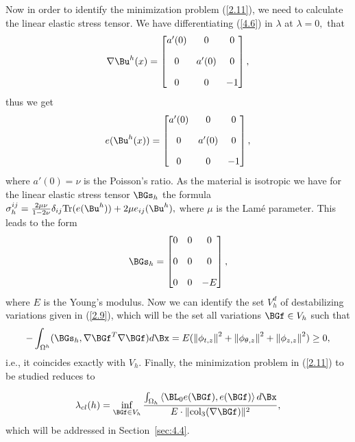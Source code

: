 Now in order to identify the minimization problem (\ref{2.11}), we need to calculate the linear elastic stress tensor. We have differentiating (\ref{4.6}) in $\lambda$ at $\lambda=0,$ that 
$$
\nabla \Bu^h(x)=
\begin{bmatrix} 
a'(0) & 0 & 0\\[10pt]
0 & a'(0) & 0\\[10pt] 
0&0&-1
\end{bmatrix},
$$
thus we get 
$$e(\Bu^h(x))=
\begin{bmatrix} 
a'(0) &  0 & 0\\[10pt]
 0 & a'(0)& 0\\[10pt] 
 0 &0 &-1
 \end{bmatrix},
 $$
 where $a'(0)=\nu$ is the Poisson's ratio. As the material is isotropic we have for the 
 linear elastic stress tensor $\BGs_h$ the formula $\Gs_h^{ij}=\frac{2\mu\nu}{1-2\nu}\delta_{ij} \mathrm{Tr}(e(\Bu^h))+2\mu e_{ij}(\Bu^h),$ where $\mu$ is the Lam\'e parameter. This leads to the form 
\begin{equation}
\label{4.9} 
\BGs_h=
 \begin{bmatrix} 
0 & 0& 0\\[10pt]
 0 & 0 & 0\\[10pt]
 0 & 0 & -E
 \end{bmatrix},
 \end{equation}
where $E$ is the Young's modulus. Now we can identify the set $V_h^d$ of destabilizing variations given in (\ref{2.9}), which will be the set all variations $\BGf\in V_h$ such that 
$$-\int_{\Omega^h}(\BGs_h,\nabla\BGf^T\nabla\BGf)d\Bx=E(\left\|\phi_{t,z}\right\|^{2}+\left\|\phi_{\theta,z}\right\|^{2}+\left\|\phi_{z,z}\right\|^{2})\geq 0,$$
i.e., it coincides exactly with $V_h.$ Finally, the minimization problem in (\ref{2.11}) to be studied reduces to 

\begin{equation}
\label{4.10}
\Gl_{cl}(h)=\inf_{\BGf\in V_h} \frac{\int_{\Omega_h} \left\langle \BL_{0} e(\BGf), e(\BGf)\right\rangle d\Bx}
{E\cdot \|\mathrm{col}_3(\nabla\BGf)\|^{2}},
\end{equation}
which will be addressed in Section~\ref{sec:4.4}.














